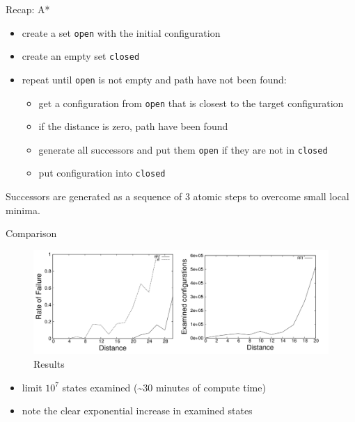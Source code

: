 \documentclass[ignorenonframetext,aspectratio=169,]{paradise-slide}
\providecommand{\tightlist}{%
  \setlength{\itemsep}{0pt}\setlength{\parskip}{0pt}}
\begin{document}
\begin{frame}[fragile]{Recap: A*}
\protect\hypertarget{recap-a}{}

\begin{itemize}
\tightlist
\item
  create a set \texttt{open} with the initial configuration
\item
  create an empty set \texttt{closed}
\item
  repeat until \texttt{open} is not empty and path have not been found:

  \begin{itemize}
  \tightlist
  \item
    get a configuration from \texttt{open} that is closest to the target
    configuration
  \item
    if the distance is zero, path have been found
  \item
    generate all successors and put them \texttt{open} if they are not
    in \texttt{closed}
  \item
    put configuration into \texttt{closed}
  \end{itemize}
\end{itemize}

Successors are generated as a sequence of 3 atomic steps to overcome
small local minima.

\end{frame}

\begin{frame}[fragile]{Comparison}
\protect\hypertarget{comparison}{}

\begin{figure}
\centering
\includegraphics{results.png}
\caption{Results}
\end{figure}

\begin{itemize}
\tightlist
\item
  limit \(10^7\) states examined (\textasciitilde30 minutes of compute
  time)
\item
  note the clear exponential increase in examined states
\end{itemize}

\end{frame}
\end{document}
